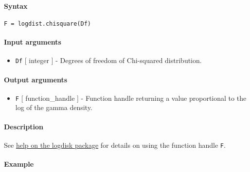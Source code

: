 


	\paragraph{Syntax}

\begin{verbatim}
F = logdist.chisquare(Df)
\end{verbatim}

\paragraph{Input arguments}

\begin{itemize}
\itemsep1pt\parskip0pt
\item
  \texttt{Df} {[} integer {]} - Degrees of freedom of Chi-squared
  distribution.
\end{itemize}

\paragraph{Output arguments}

\begin{itemize}
\itemsep1pt\parskip0pt
\item
  \texttt{F} {[} function\_handle {]} - Function handle returning a
  value proportional to the log of the gamma density.
\end{itemize}

\paragraph{Description}

See \href{logdist/Contents}{help on the logdisk package} for details on
using the function handle \texttt{F}.

\paragraph{Example}



